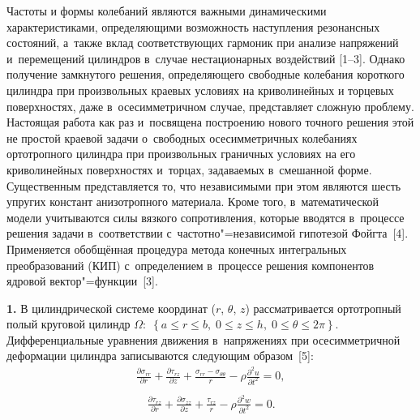 Частоты и формы колебаний являются важными динамическими характеристиками, 
определяющими возможность наступления резонансных состояний, а~также вклад 
соответствующих гармоник при анализе напряжений и~перемещений цилиндров 
в~случае нестационарных воздействий [1--3]. Однако получение замкнутого 
решения, определяющего свободные колебания короткого цилиндра при 
произвольных краевых условиях на криволинейных и торцевых поверхностях, даже 
в~осесимметричном случае, представляет сложную проблему. Настоящая работа как 
раз и~посвящена построению нового точного решения этой не простой краевой 
задачи о~свободных осесимметричных колебаниях ортотропного цилиндра при 
произвольных граничных условиях на его криволинейных поверхностях и~торцах, 
задаваемых в~смешанной форме. Существенным представляется то, что 
независимыми при этом являются шесть упругих констант анизотропного 
материала. Кроме того, в~математической модели учитываются силы вязкого 
сопротивления, которые вводятся в~процессе решения задачи в~соответствии 
с~частотно"=независимой гипотезой Фойгта~[4]. Применяется обобщённая процедура 
метода конечных интегральных преобразований (КИП) с~определением в~процессе 
решения компонентов ядровой вектор"=функции~[3].

\textbf{1.} В цилиндрической системе координат ($r$, $\theta$, $z$) 
рассматривается ортотропный полый круговой цилиндр 
$\Omega:\;\left\{ a \leqslant r \leqslant b,\;0 \leqslant z \leqslant h,\;0 \leqslant \theta 
\leqslant 2\pi  \right\}$. Дифференциальные уравнения движения 
в~напряжениях при осесимметричной деформации цилиндра записываются следующим 
образом~[5]:
\begin{equation}
\label{senic:eq1}
 \begin{array}{r}
\displaystyle
\frac{\partial \sigma _{rr} }{\partial r} + \frac{\partial \tau _{rz} 
}{\partial z} + \frac{\sigma _{rr} - \sigma _{\theta \theta } }{r} - \rho 
\frac{\partial ^2u}{\partial t^2} = 0,\\
\displaystyle
{\phantom{\int\limits^1}}\frac{\partial \tau _{rz} }{\partial r} + \frac{\partial \sigma _{zz} 
}{\partial z} + \frac{\tau _{rz} }{r} - \rho \frac{\partial ^2w}{\partial 
t^2} = 0.
 \end{array}
\end{equation}

